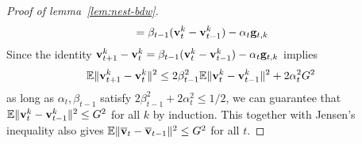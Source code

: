 \begin{proof}[Proof of lemma~\ref{lem:nest-bdw}]
\begin{align*}
& =\beta_{t-1}({\mathbf{v}}_{t}^{k}-{\mathbf{v}}_{t-1}^{k})-\alpha_{t}{\mathbf{g}}_{t,k}
\end{align*}
Since the identity ${\mathbf{v}}_{t+1}^{k}-{\mathbf{v}}_{t}^{k}=\beta_{t-1}({\mathbf{v}}_{t}^{k}-{\mathbf{v}}_{t-1}^{k})-\alpha_{t}{\mathbf{g}}_{t,k}$
implies 
\begin{align*}
\mathbb{E}\|{\mathbf{v}}_{t+1}^{k}-{\mathbf{v}}_{t}^{k}\|^{2} & \leq2\beta_{t-1}^{2}\mathbb{E}\|{\mathbf{v}}_{t}^{k}-{\mathbf{v}}_{t-1}^{k}\|^{2}+2\alpha_{t}^{2}G^{2}
\end{align*}
as long as $\alpha_{t},\beta_{t-1}$ satisfy $2\beta_{t-1}^{2}+2\alpha_{t}^{2}\leq1/2$,
we can guarantee that $\mathbb{E}\|{\mathbf{v}}_{t}^{k}-{\mathbf{v}}_{t-1}^{k}\|^{2}\leq G^{2}$
for all $k$ by induction. This together with Jensen's inequality
also gives $\mathbb{E}\|{\overline{\mathbf{v}}}_{t}-{\overline{\mathbf{v}}}_{t-1}\|^{2}\leq G^{2}$
for all $t$. 
\end{proof}

